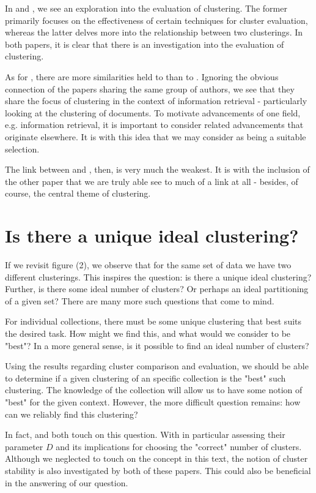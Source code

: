 \documentclass[sigconf,authorversion,nonacm]{acmart}
\begin{document}
In \cite{Yuan2022} and \cite{Cazals2019}, we see an exploration into the evaluation of clustering. The former primarily
focuses on the effectiveness of certain techniques for cluster evaluation, whereas the latter delves more into the
relationship between two clusterings. In both papers, it is clear that there is an investigation into the evaluation of
clustering.

As for \cite{Yuan2021}, there are more similarities held to \cite{Yuan2022} than to \cite{Cazals2019}. Ignoring the
obvious connection of the papers sharing the same group of authors, we see that they share the focus of clustering in
the context of information retrieval - particularly looking at the clustering of documents. To motivate advancements of
one field, e.g. information retrieval, it is important to consider related advancements that originate elsewhere. It is
with this idea that we may consider \cite{Cazals2019} as being a suitable selection.

The link between \cite{Yuan2021} and \cite{Cazals2019}, then, is very much the weakest. It is with the inclusion of the
other paper that we are truly able see to much of a link at all - besides, of course, the central theme of clustering.
\section{Is there a unique ideal clustering?} If we revisit figure (2), we observe that for the same set of data we have
two different clusterings. This inspires the question: is there a unique ideal clustering? Further, is there some ideal
number of clusters? Or perhaps an ideal partitioning of a given set? There are many more such questions that come to
mind.

For individual collections, there must be some unique clustering that best suits the desired task. How might we find
this, and what would we consider to be "best"? In a more general sense, is it possible to find an ideal number of
clusters?

Using the results regarding cluster comparison and evaluation, we should be able to determine if a given clustering of
an specific collection is the "best" such clustering. The knowledge of the collection will allow us to have some notion
of "best" for the given context. However, the more difficult question remains: how can we reliably find this clustering?

In fact, \cite{Yuan2022} and \cite{Cazals2019} both touch on this question. With \cite{Cazals2019} in particular
assessing their parameter $D$ and its implications for choosing the "correct" number of clusters. Although we neglected
to touch on the concept in this text, the notion of cluster stability is also investigated by both of these papers. This
could also be beneficial in the answering of our question.
\end{document}
